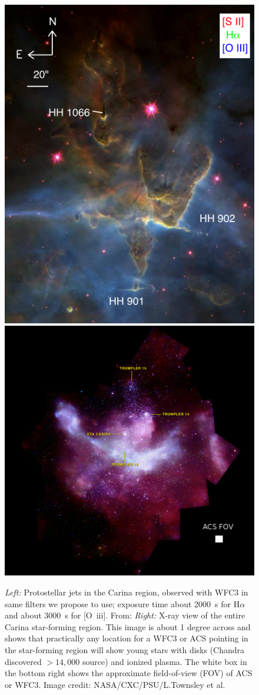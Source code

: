\documentclass[12pt]{article}
\begin{document}
\begin{figure}
    \centering
    \includegraphics[width=.45\textwidth]{reiter13_fig3.png}
    \includegraphics[width=.54\textwidth]{carina_xray_label.jpg}
    \caption{\emph{Left:} Protostellar jets in the Carina region, observed with WFC3 in same filters we propose to use; exposure time about 2000~s for H$\alpha$ and about 3000~s for [O~{\sc iii}]. From: \citet{2013MNRAS.433.2226R} \emph{Right:} X-ray view of the entire Carina star-forming region. This image is about 1 degree across and shows that practically any location for a WFC3 or ACS pointing in the star-forming region will show young stars with disks (Chandra discovered $> 14,000$ source) and ionized plasma. The white box in the bottom right shows the approximate field-of-view (FOV) of ACS or WFC3. Image credit: NASA/CXC/PSU/L.Townsley et al.}
    \label{fig:reiter}
\end{figure}
\end{document}
